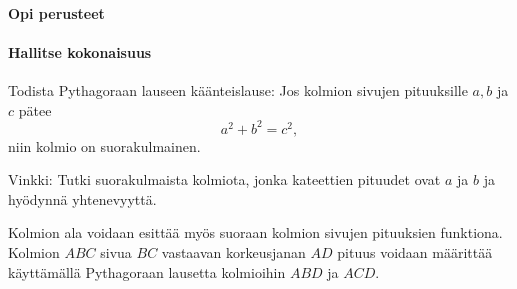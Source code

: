 \begin{tehtavasivu}

\paragraph*{Opi perusteet}

\paragraph*{Hallitse kokonaisuus}

\begin{tehtava}
Todista Pythagoraan lauseen käänteislause: Jos kolmion sivujen pituuksille $a,b$ ja $c$ pätee
\[
a^2+b^2 = c^2,
\]
niin kolmio on suorakulmainen.

\begin{vastaus}
Vinkki: Tutki suorakulmaista kolmiota, jonka kateettien pituudet ovat $a$ ja $b$ ja hyödynnä yhtenevyyttä.
\end{vastaus}
\end{tehtava}

\begin{tehtava}
Kolmion ala voidaan esittää myös suoraan kolmion sivujen pituuksien funktiona. Kolmion $ABC$ sivua $BC$ vastaavan korkeusjanan $AD$ pituus voidaan määrittää käyttämällä Pythagoraan lausetta kolmioihin $ABD$ ja $ACD$.
\begin{alakohdat}
\end{alakohdat}

\begin{vastaus}
\begin{alakohdat}
\end{alakohdat}
\end{vastaus}
\end{tehtava}


\end{tehtavasivu}
